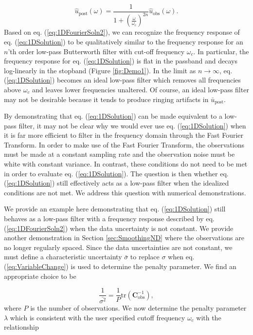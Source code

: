 \documentclass[10pt,a4paper]{article}
\begin{document}
\begin{equation}\label{eq:1DFourierSoln2}
\hat{u}_\mathrm{post}(\omega) = \frac{1}
                                  {1 + \left(\frac{\omega}{\omega_c}\right)^{2n}}
                                  \hat{u}_\mathrm{obs}(\omega).        
\end{equation}
Based on eq. (\ref{eq:1DFourierSoln2}), we can recognize the frequency response of eq. (\ref{eq:1DSolution}) to be qualitatively similar to the frequency response for an $n$'th order low-pass Butterworth filter with cut-off frequency $\omega_c$.  In particular, the frequency response for eq. (\ref{eq:1DSolution}) is flat in the passband and decays log-linearly in the stopband (Figure \ref{fig:Demo1}).  In the limit as $n\to \infty$, eq. (\ref{eq:1DSolution}) becomes an ideal low-pass filter which removes all frequencies above $\omega_c$ and leaves lower frequencies unaltered.  Of course, an ideal low-pass filter may not be desirable because it tends to produce ringing artifacts in $\bar{u}_\mathrm{post}$. 

By demonstrating that eq. (\ref{eq:1DSolution}) can be made equivalent to a low-pass filter, it may not be clear why we would ever use eq. (\ref{eq:1DSolution}) when it is far more efficient to filter in the frequency domain through the Fast Fourier Transform.  In order to make use of the Fast Fourier Transform, the observations must be made at a constant sampling rate and the observation noise must be  white with constant variance.  In contrast, these conditions do not need to be met in order to evaluate eq. (\ref{eq:1DSolution}). The question is then whether eq. (\ref{eq:1DSolution}) still effectively acts as a low-pass filter when the idealized conditions are not met.  We address this question with numerical demonstrations. 

We provide an example here demonstrating that eq. (\ref{eq:1DSolution}) still behaves as a low-pass filter with a frequency response described by eq. (\ref{eq:1DFourierSoln2}) when the data uncertainty is not constant.  We provide another demonstration in Section \ref{sec:SmoothingND} where the observations are no longer regularly spaced. Since the data uncertainties are not constant, we must define a characteristic uncertainty $\bar{\sigma}$ to replace $\sigma$ when eq. (\ref{eq:VariableChange}) is used to determine the penalty parameter.  We find an appropriate choice to be 

\begin{equation}
\frac{1}{\bar{\sigma^2}} = \frac{1}{P} \mathrm{tr}\left(\mathbf{C}_\mathrm{obs}^{-1}\right),
\end{equation}
where $P$ is the number of observations.  We now determine the penalty parameter $\lambda$ which is consistent with the user specified cutoff frequency $\omega_c$ with the relationship
\end{document}
